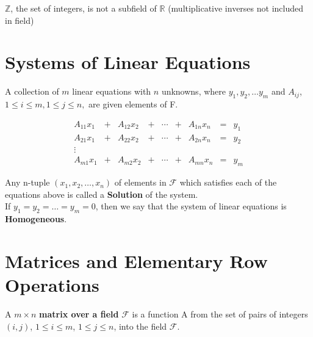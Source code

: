 \documentclass[../Main.tex]{subfiles}
\begin{document}
$\mathbb{Z}$, the set of integers, is not a subfield of $\mathbb{R}$ (multiplicative inverses not included in field)


\section{Systems of Linear Equations}

A collection of $m$ linear equations with $n$ unknowns, where $y_1, y_2, \dots y_{m}$ and $A_{ij}$, $1 \leq i \leq m, 1 \leq j \leq n,$ are given elements of F. 

\begin{equation}
   \begin{matrix} \label{linear eq sys}
      A_{11}x_{1} &+& A_{12}x_{2} &+ &\cdots&+& A_{1n}x_{n} &=& y_{1}\\
      A_{21}x_{1} &+& A_{22}x_{2} &+ &\cdots&+& A_{2n}x_{n} &=& y_{2}\\
      \vdots\\
      A_{m1}x_{1} &+& A_{m2}x_{2} &+ &\cdots&+& A_{mn}x_{n} &=& y_{m}
   \end{matrix}
\end{equation}

Any n-tuple $(x_1, x_2, \dots, x_n)$ of elements in $\mathcal{F}$ which satisfies each of the equations above is called a \textbf{Solution} of the system.\\
If $y_1=y_2=\dots=y_m=0$, then we say that the system of linear equations is \textbf{Homogeneous}.


\section{Matrices and Elementary Row Operations}

A $m \times n$ \textbf{matrix over a field} $\mathcal{F}$ is a function A from the set of pairs of integers $(i,j)$, $1 \leq i \leq m$, $1 \leq j \leq n$, into the field $\mathcal{F}$. 
\end{document}
